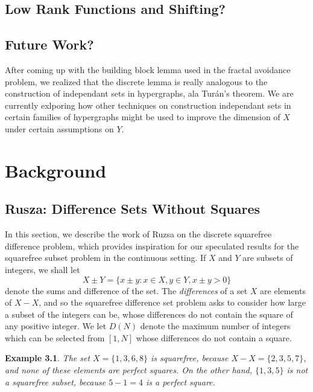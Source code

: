 \documentclass{report}
\theoremstyle{plain}
\newtheorem*{example}{Example}
\theoremstyle{plain}
\begin{document}
\section{Low Rank Functions and Shifting?}

\section{Future Work?}

After coming up with the building block lemma used in the fractal avoidance problem, we realized that the discrete lemma is really analogous to the construction of independant sets in hypergraphs, ala Tur\'{a}n's theorem. We are currently exlporing how other techniques on construction independant sets in certain families of hypergraphs might be used to improve the dimension of $X$ under certain assumptions on $Y$.

\chapter{Background}

\section{Rusza: Difference Sets Without Squares}

In this section, we describe the work of Ruzsa on the discrete squarefree difference problem, which provides inspiration for our speculated results for the squarefree subset problem in the continuous setting. If $X$ and $Y$ are subsets of integers, we shall let
%
\[ X \pm Y = \{ x \pm y: x \in X, y \in Y, x \pm y > 0 \} \]
%
denote the sums and difference of the set. The {\it differences} of a set $X$ are elements of $X - X$, and so the squarefree difference set problem asks to consider how large a subset of the integers can be, whose differences do not contain the square of any positive integer. We let $D(N)$ denote the maximum number of integers which can be selected from $[1,N]$ whose differences do not contain a square.

\begin{example}
    The set $X = \{ 1, 3, 6, 8 \}$ is squarefree, because $X - X = \{ 2, 3, 5, 7 \}$, and none of these elements are perfect squares. On the other hand, $\{ 1, 3, 5 \}$ is not a squarefree subset, because $5 - 1 = 4$ is a perfect square.
\end{example}
\end{document}
